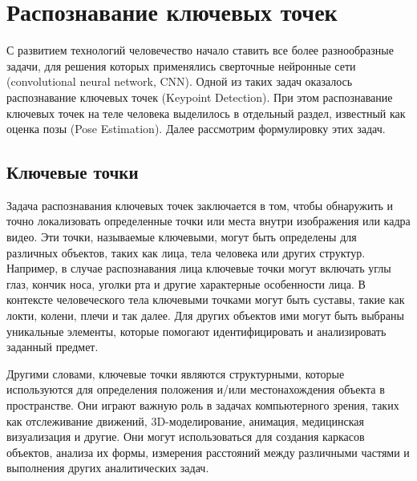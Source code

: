 \section{Распознавание ключевых точек}
\label{sec:Chapter2} 

С развитием технологий человечество начало ставить все более разнообразные задачи, для решения которых применялись сверточные нейронные сети (convolutional neural network, CNN). Одной из таких задач оказалось распознавание ключевых точек (Keypoint Detection). При этом распознавание ключевых точек на теле человека выделилось в отдельный раздел, известный как оценка позы (Pose Estimation). Далее рассмотрим формулировку этих задач.

\subsection{Ключевые точки}

Задача распознавания ключевых точек заключается в том, чтобы обнаружить и точно локализовать определенные точки или места внутри изображения или кадра видео. Эти точки, называемые ключевыми, могут быть определены для различных объектов, таких как лица, тела человека или других структур. Например, в случае распознавания лица ключевые точки могут включать углы глаз, кончик носа, уголки рта и другие характерные особенности лица. В контексте человеческого тела ключевыми точками могут быть суставы, такие как локти, колени, плечи и так далее. Для других объектов ими могут быть выбраны уникальные элементы, которые помогают идентифицировать и анализировать заданный предмет.

Другими словами, ключевые точки являются структурными, которые используются для определения положения и/или местонахождения объекта в пространстве. Они играют важную роль в задачах компьютерного зрения, таких как отслеживание движений, 3D-моделирование, анимация, медицинская визуализация и другие. Они могут использоваться для создания каркасов объектов, анализа их формы, измерения расстояний между различными частями и выполнения других аналитических задач.

